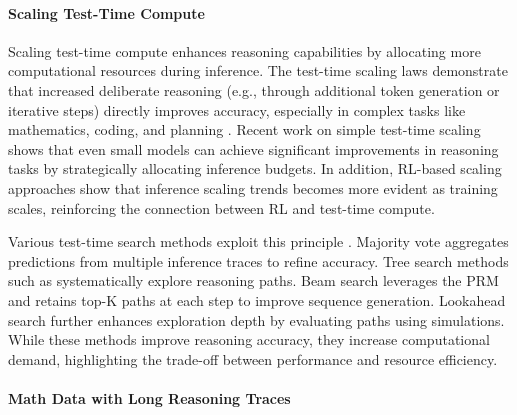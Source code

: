 \paragraph{Scaling Test-Time Compute}
Scaling test-time compute enhances reasoning capabilities by allocating more computational resources during inference. The test-time scaling laws demonstrate that increased deliberate reasoning (e.g., through additional token generation or iterative steps) directly improves accuracy, especially in complex tasks like mathematics, coding, and planning \cite{snell2024scaling,wu2024empirical,brown2024large,beeching2024scalingtesttimecompute}.
Recent work on simple test-time scaling \cite{muennighoff2025s1} shows that even small models can achieve significant improvements in reasoning tasks by strategically allocating inference budgets. In addition, RL-based scaling approaches \cite{hou2025advancing} show that inference scaling trends becomes more evident as training scales, reinforcing the connection between RL and test-time compute.

Various test-time search methods exploit this principle \cite{kang2024mindstar,wang2024q}. Majority vote aggregates predictions from multiple inference traces to refine accuracy. Tree search methods such as \cite{yao2024tree,hao2023reasoning,zhang2024accessing,qi2024mutual} systematically explore reasoning paths. Beam search \cite{smoke1961program} leverages the PRM and retains top-K paths at each step to improve sequence generation. Lookahead search \cite{snell2024scaling} further enhances exploration depth by evaluating paths using simulations. While these methods improve reasoning accuracy, they increase computational demand, highlighting the trade-off between performance and resource efficiency.


\paragraph{Math Data with Long Reasoning Traces}

